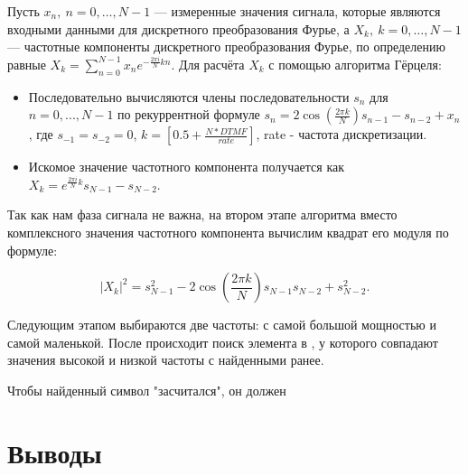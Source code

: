 Пусть $x_{n},\ n=0,\dots ,N-1$ — измеренные значения сигнала, которые являются входными данными для дискретного преобразования Фурье, а $X_{k},\ k=0,\dots ,N-1$ — частотные компоненты дискретного преобразования Фурье, по определению равные $X_{k}=\sum _{n=0}^{N-1}x_{n}e^{-{\frac {2\pi i}{N}}kn}$.
Для расчёта $X_{k}$ с помощью алгоритма Гёрцеля:
\begin{itemize}
	\item Последовательно вычисляются члены последовательности $s_n$ для $n=0, ..., N-1$ по рекуррентной формуле $s_{n}=2\cos \left({\frac {2\pi k}{N}}\right)s_{n-1}-s_{n-2}+x_{n}$, где $s_{-1}=s_{-2}=0$, $k = [0.5 + \frac{N * DTMF}{rate}]$, rate - частота дискретизации.
	\item Искомое значение частотного компонента получается как $X_{k}=e^{{\frac {2\pi i}{N}}k}s_{N-1}-s_{N-2}$.
\end{itemize}

Так как нам фаза сигнала не важна, на втором этапе алгоритма вместо комплексного значения частотного компонента вычислим квадрат его модуля по формуле: 

\begin{equation}
	|X_{k}|^{2}=s_{N-1}^{2}-2\cos \left({\frac {2\pi k}{N}}\right)s_{N-1}s_{N-2}+s_{N-2}^{2}.
\end{equation}

Следующим этапом выбираются две частоты: с самой большой мощностью и самой маленькой. После происходит поиск элемента в , у которого совпадают значения высокой и низкой частоты с найденными ранее.

Чтобы найденный символ "засчитался", он должен  

\section{Выводы} \label{ch1:conclusion}



%
\newpage %
